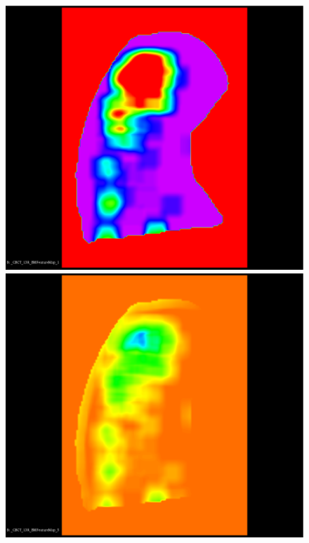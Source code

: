 \documentclass{InsightArticle}
\begin{document}
\begin{figure}[H]
  \begin{center}
    \includegraphics[scale=0.15]{figures/BVTV.eps}
    \includegraphics[scale=0.15]{figures/BSBV.eps}

\end{center}
\end{figure}
\end{document}
